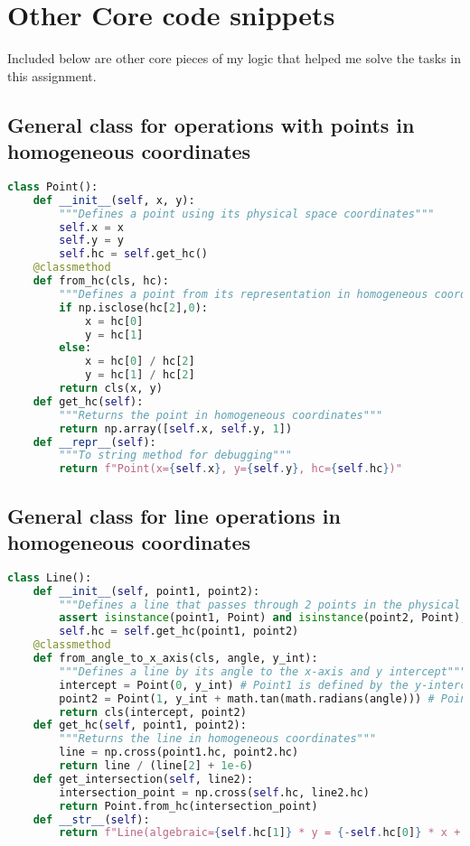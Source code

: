 \documentclass{article}
\begin{document}
\section{Other Core code snippets}
Included below are other core pieces of my logic that helped me solve the tasks in this assignment.
\subsection{General class for operations with points in homogeneous coordinates}
\begin{lstlisting}[language=Python]
class Point():
    def __init__(self, x, y):
        """Defines a point using its physical space coordinates"""
        self.x = x
        self.y = y
        self.hc = self.get_hc()
    @classmethod
    def from_hc(cls, hc):
        """Defines a point from its representation in homogeneous coordinates"""
        if np.isclose(hc[2],0):
            x = hc[0]
            y = hc[1]
        else:
            x = hc[0] / hc[2]
            y = hc[1] / hc[2]
        return cls(x, y)
    def get_hc(self):
        """Returns the point in homogeneous coordinates"""
        return np.array([self.x, self.y, 1])
    def __repr__(self):
        """To string method for debugging"""
        return f"Point(x={self.x}, y={self.y}, hc={self.hc})"
\end{lstlisting}

\subsection{General class for line operations in homogeneous coordinates}
\begin{lstlisting}[language=Python]
class Line():
    def __init__(self, point1, point2):
        """Defines a line that passes through 2 points in the physical space"""
        assert isinstance(point1, Point) and isinstance(point2, Point), "A line should be created by 2 Points, or by its angle to the x-axis"
        self.hc = self.get_hc(point1, point2)
    @classmethod
    def from_angle_to_x_axis(cls, angle, y_int):
        """Defines a line by its angle to the x-axis and y intercept"""
        intercept = Point(0, y_int) # Point1 is defined by the y-intercept
        point2 = Point(1, y_int + math.tan(math.radians(angle))) # Point 2 is the point on the line at x=1
        return cls(intercept, point2)
    def get_hc(self, point1, point2):
        """Returns the line in homogeneous coordinates"""
        line = np.cross(point1.hc, point2.hc)
        return line / (line[2] + 1e-6)
    def get_intersection(self, line2):
        intersection_point = np.cross(self.hc, line2.hc)
        return Point.from_hc(intersection_point)
    def __str__(self):
        return f"Line(algebraic={self.hc[1]} * y = {-self.hc[0]} * x + {-self.hc[2]}, hc={self.hc})"
\end{lstlisting}
\end{document}
